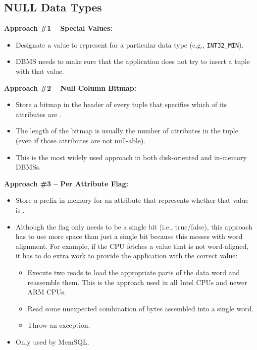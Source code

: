 \documentclass[11pt]{article}
\begin{document}
\subsection*{NULL Data Types}

\textbf{Approach \#1 -- Special Values:}
\begin{itemize}
    \item
    Designate a value to represent  for a particular 
    data type (e.g., \texttt{INT32\_MIN}).
    
    \item
    DBMS needs to make sure that the application does not try to insert a tuple with that value.
\end{itemize}

\textbf{Approach \#2 -- Null Column Bitmap:} 
\begin{itemize}
    \item
    Store a bitmap in the header of every tuple that specifies 
    which of its attributes are .
    
    \item
    The length of the bitmap is usually the number of attributes in the tuple (even if those 
    attributes are not null-able).
    
    \item
    This is the most widely used approach in both disk-oriented and in-memory DBMSs.
\end{itemize}

\textbf{Approach \#3 -- Per Attribute Flag:}
\begin{itemize}
    \item
    Store a prefix in-memory for an attribute that represents whether that value is . 

    \item
    Although the flag only needs to be a single bit (i.e., true/false), this approach has to 
    use more space than just a single bit because this messes with word alignment.
    For example, if the CPU fetches a value that is not word-aligned, it has to do 
    extra work to provide the application with the correct value:
    \begin{itemize}
        \item
        Execute two reads to load the appropriate parts of the data word and reassemble them.
        This is the approach used in all Intel CPUs and newer ARM CPUs.
        
        \item
        Read some unexpected combination of bytes assembled into a single word.
        
        \item
        Throw an exception.
    \end{itemize}
    
    \item
    Only used by MemSQL.
\end{itemize}
\end{document}
